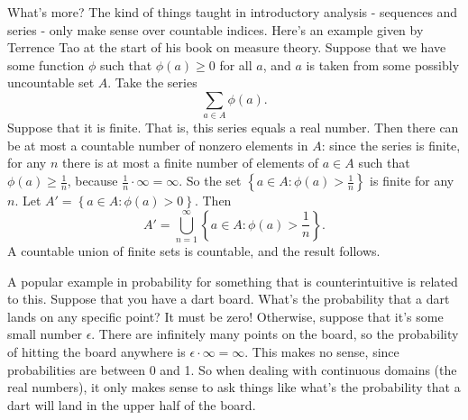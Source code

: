 \documentclass[letterpaper]{article}
\numberwithin{equation}{section}
\begin{document}
What's more? The kind of things taught in introductory analysis - sequences and series - only make sense over countable indices. Here's an example given by Terrence Tao at the start of his book on measure theory. Suppose that we have some function $\phi$ such that $\phi(a)\ge0$ for all $a$, and $a$ is taken from some possibly uncountable set $A$. Take the series
\[
  \sum_{a\in A}\phi(a).
\]
Suppose that it is finite. That is, this series equals a real number. Then there can be at most a countable number of nonzero elements in $A$: since the series is finite, for any $n$ there is at most a finite number of elements of $a\in A$ such that $\phi(a)\ge\frac{1}{n}$, because $\frac{1}{n}\cdot\infty=\infty$. So the set $\left\{a\in A:\phi(a)>\frac{1}{n}\right\}$ is finite for any $n$. Let $A'=\left\{ a\in A:\phi(a)>0\right\}$. Then
\[
  A'=\bigcup\limits_{n=1}^\infty \left\{a\in A:\phi(a)>\frac{1}{n}\right\}.
\]
A countable union of finite sets is countable, and the result follows.

A popular example in probability for something that is counterintuitive is related to this. Suppose that you have a dart board. What's the probability that a dart lands on any specific point? It must be zero! Otherwise, suppose that it's some small number $\epsilon$. There are infinitely many points on the board, so the probability of hitting the board anywhere is $\epsilon\cdot\infty=\infty$. This makes no sense, since probabilities are between 0 and 1. So when dealing with continuous domains (the real numbers), it only makes sense to ask things like what's the probability that a dart will land in the upper half of the board.
\end{document}
